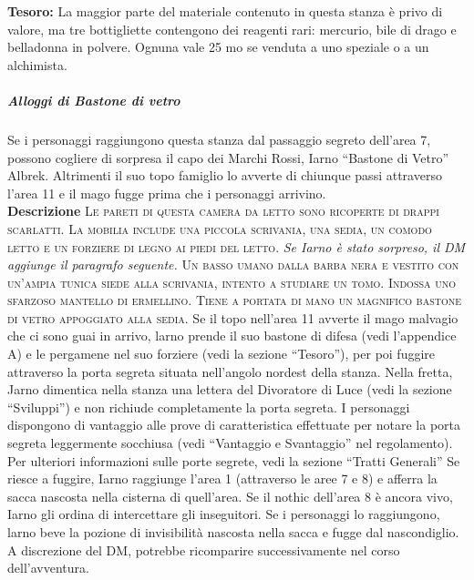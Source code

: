 \documentclass{article}
\begin{document}
\textbf{Tesoro:} La maggior parte del materiale contenuto in questa stanza
è privo di valore, ma tre bottigliette contengono dei reagenti
rari: mercurio, bile di drago e belladonna in polvere. Ognuna
vale 25 mo se venduta a uno speziale o a un alchimista.
\subparagraph{Alloggi di Bastone di vetro} Se i personaggi raggiungono questa stanza dal passaggio
segreto dell'area 7, possono cogliere di sorpresa il capo dei
Marchi Rossi, Iarno “Bastone di Vetro” Albrek. Altrimenti
il suo topo famiglio lo avverte di chiunque passi attraverso
l’area 11 e il mago fugge prima che i personaggi arrivino. \\
 \textbf{Descrizione} \textsc{ Le pareti di questa camera da letto sono ricoperte di drappi
scarlatti. La mobilia include una piccola scrivania, una sedia,
un comodo letto e un forziere di legno ai piedi del letto. }
\textit{Se Iarno è stato sorpreso, il DM aggiunge il
paragrafo seguente.} \textsc{Un basso umano dalla barba nera e vestito con un'ampia
tunica siede alla scrivania, intento a studiare un tomo. Indossa
uno sfarzoso mantello di ermellino. Tiene a portata di mano
un magnifico bastone di vetro appoggiato alla sedia.}
Se il topo nell’area 11 avverte il mago malvagio che ci
sono guai in arrivo, larno prende il suo bastone di difesa
(vedi l’appendice A) e le pergamene nel suo forziere (vedi
la sezione “Tesoro”), per poi fuggire attraverso la porta
segreta situata nell'angolo nordest della stanza. Nella fretta,
Jarno dimentica nella stanza una lettera del Divoratore di Luce
(vedi la sezione “Sviluppi”) e non richiude completamente
la porta segreta. I personaggi dispongono di vantaggio alle
prove di caratteristica effettuate per notare la porta segreta
leggermente socchiusa (vedi “Vantaggio e Svantaggio” nel
regolamento). Per ulteriori informazioni sulle porte segrete,
vedi la sezione “Tratti Generali” 
Se riesce a fuggire, Iarno raggiunge l’area 1 (attraverso
le aree 7 e 8) e afferra la sacca nascosta nella cisterna di
quell’area. Se il nothic dell’area 8 è ancora vivo, Iarno gli
ordina di intercettare gli inseguitori. Se i personaggi lo
raggiungono, larno beve la pozione di invisibilità nascosta
nella sacca e fugge dal nascondiglio. A discrezione del
DM, potrebbe ricomparire successivamente nel corso
dell'avventura.
\end{document}
